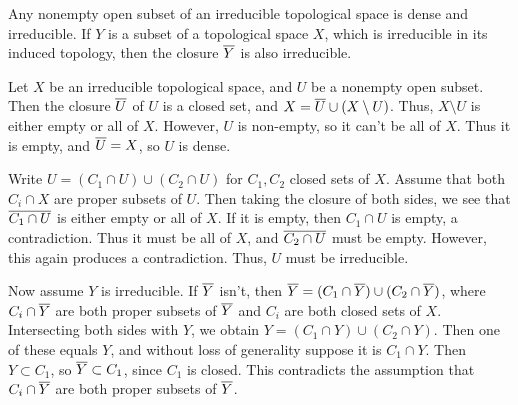 \begin{questions}
\question Any nonempty open subset of an irreducible topological space is dense
and irreducible. If $Y$ is a subset of a topological space $X$, which is
irreducible in its induced topology, then the closure $\overline{Y}$ is also
irreducible.
\begin{solution}
Let $X$ be an irreducible topological space, and $U$ be a nonempty open
subset. Then the closure $\overline{U}$ of $U$ is a closed set, and $X = \overline{U}
\cup (X \setminus U)$. Thus, $X \setminus U$ is either empty or all of $X$.
However, $U$ is non-empty, so it can't be all of $X$. Thus it is empty, and
$\overline{U} = X$, so $U$ is dense.

Write $U = (C_1 \cap U) \cup (C_2 \cap U)$ for $C_1, C_2$ closed sets of $X$.
Assume that both $C_i \cap X$ are proper subsets of $U$.
Then taking the closure of both sides, we see that $\overline{C_1 \cap U}$ is either
empty or all of $X$. If it is empty, then $C_1 \cap U$ is empty, a
contradiction. Thus it must be all of $X$, and $\overline{C_2 \cap U}$ must be
empty. However, this again produces a contradiction. Thus, $U$ must be
irreducible.

Now assume $Y$ is irreducible. If $\overline{Y}$ isn't, then
$\overline{Y} = (C_1 \cap \overline{Y}) \cup (C_2 \cap \overline{Y})$, where $C_i \cap
\overline{Y}$ are both proper subsets of $\overline{Y}$ and $C_i$ are both closed sets
of $X$. Intersecting both sides with $Y$, we obtain $Y = (C_1 \cap Y) \cup (C_2
\cap Y)$. Then one of these equals $Y$, and without loss of generality suppose
it is $C_1 \cap Y$. Then $Y \subset C_1$, so $\overline{Y} \subset C_1$, since $C_1$
is closed. This contradicts the assumption that $C_i \cap \overline{Y}$ are both
proper subsets of $\overline{Y}$.
\end{solution}


\question
{}
\end{questions}
